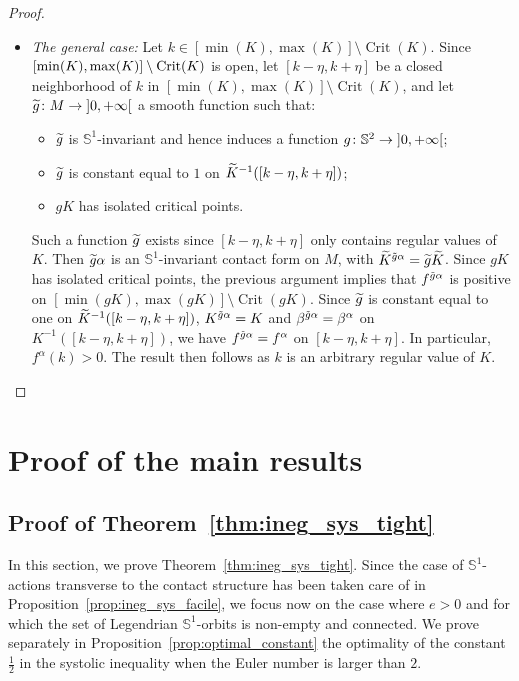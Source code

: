 \documentclass[10pt,a4paper]{amsart}
\DeclareMathOperator{\Crit}{Crit}
\newcommand{\bbS}{\mathbb{S}}
\renewcommand*{\to}{\mathchoice{\longrightarrow}{\rightarrow}{\rightarrow}{\rightarrow}}
\let\oldtilde\tilde
\renewcommand*{\tilde}[1]{\mathchoice{\widetilde{#1}}{\widetilde{#1}}{\oldtilde{#1}}{\oldtilde{#1}}}
\theoremstyle{definition}\newtheorem{defi}[theo]{Definition}
\begin{document}
\begin{proof}
\begin{itemize}
\item
\emph{The general case: } Let $k \in [\min(K), \max(K)] \setminus \Crit(K)$. Since $[\min(K),\linebreak \max(K)] \setminus \Crit(K)$ is open, let $[k-\eta, k + \eta]$ be a closed neighborhood of $k$ in $[\min(K), \max(K)] \setminus \Crit(K)$, and let $\tilde g \colon M \to\mathopen{]}0, +\infty\mathclose{[}$ a smooth function such that:
\begin{itemize}
\item $\tilde g$ is $\bbS^1$-invariant and hence induces a function $g \colon \bbS^2 \to\mathopen{]}0, + \infty\mathclose{[}$;
\item $\tilde g$ is constant equal to $1$ on $\tilde K^{-1}([k-\eta, k + \eta])$;
\item $g K$ has isolated critical points.
\end{itemize}
Such a function $\tilde g$ exists since $[k-\eta, k + \eta]$ only contains regular values of~$K$. Then $\tilde g \alpha$ is an $\bbS^1$-invariant contact form on $M$, with $\tilde K^{\tilde g \alpha} = \tilde g \tilde K$. Since $gK$ has isolated critical points, the previous argument implies that $f^{\tilde g \alpha}$ is positive on $[\min(gK), \max(gK)] \setminus \Crit(gK)$. Since $\tilde g$ is constant equal to one on $\tilde K^{-1}([k-\eta, k + \eta])$, $K^{\tilde g \alpha} = K$ and $\beta^{ \tilde g \alpha} = \beta^\alpha$ on $K^{-1}([k-\eta, k + \eta])$, we have $f^{\tilde g \alpha} = f^\alpha$ on $[k-\eta, k + \eta]$. In particular, $f^\alpha(k) > 0$. The result then follows as $k$ is an arbitrary regular value of $K$.\qedhere
\end{itemize}
\end{proof}

\section{Proof of the main results}

\subsection{Proof of Theorem~\ref{thm:ineg_sys_tight}} In this section, we prove Theorem~\ref{thm:ineg_sys_tight}. Since the case of $\bbS^1$-actions transverse to the contact structure has been taken care of in Proposition~\ref{prop:ineg_sys_facile}, we focus now on the case where $e > 0$ and for which the set of Legendrian $\bbS^1$-orbits is non-empty and connected. We prove separately in Proposition~\ref{prop:optimal_constant} the optimality of the constant $\frac{1}{2}$ in the systolic inequality when the Euler number is larger than $2$.
\end{document}
